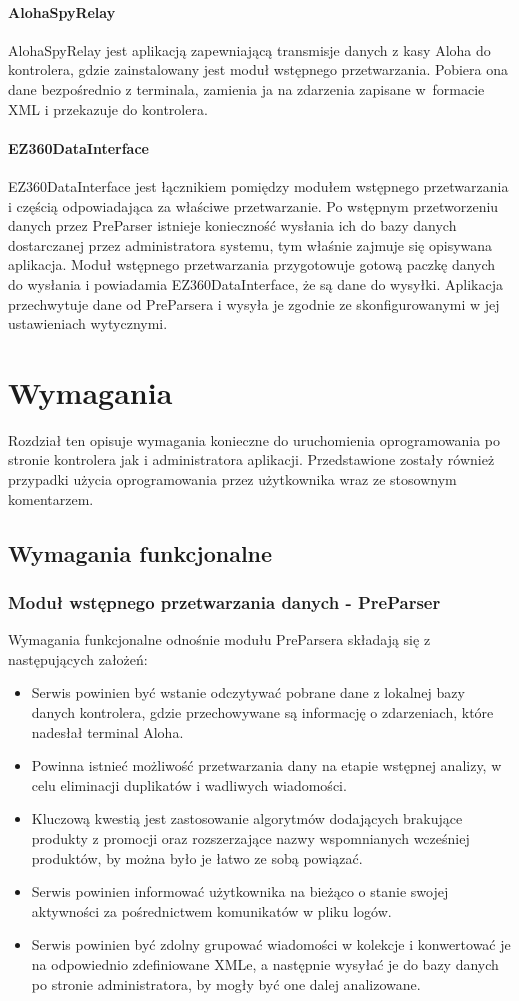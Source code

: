 \documentclass[a4paper]{book}
\begin{document}
\subsubsection{AlohaSpyRelay}
AlohaSpyRelay jest aplikacją zapewniającą transmisje danych z kasy Aloha do kontrolera, gdzie zainstalowany jest moduł wstępnego przetwarzania. Pobiera ona dane bezpośrednio z terminala, zamienia ja na zdarzenia zapisane w~formacie XML i przekazuje do kontrolera.
\subsubsection{EZ360DataInterface}
EZ360DataInterface jest łącznikiem pomiędzy modułem wstępnego przetwarzania i częścią odpowiadająca za właściwe przetwarzanie. Po wstępnym przetworzeniu danych przez PreParser istnieje konieczność wysłania ich do bazy danych dostarczanej przez administratora systemu, tym właśnie zajmuje się opisywana aplikacja. Moduł wstępnego przetwarzania przygotowuje gotową paczkę danych do wysłania i powiadamia EZ360DataInterface, że są dane do wysyłki. Aplikacja przechwytuje dane od PreParsera i wysyła je zgodnie ze skonfigurowanymi w jej ustawieniach wytycznymi.
\chapter{Wymagania}
\label{rozdzial3}
Rozdział ten opisuje wymagania konieczne do uruchomienia oprogramowania po stronie kontrolera jak i administratora aplikacji. Przedstawione zostały również przypadki użycia oprogramowania przez użytkownika wraz ze stosownym komentarzem.
\section{Wymagania funkcjonalne}
\subsection{Moduł wstępnego przetwarzania danych - PreParser}
Wymagania funkcjonalne odnośnie modułu PreParsera składają się z następujących założeń:
\begin{itemize}
	\item Serwis powinien być wstanie odczytywać pobrane dane z lokalnej bazy danych kontrolera, gdzie przechowywane są informację o zdarzeniach, które nadesłał terminal Aloha.
	\item Powinna istnieć możliwość przetwarzania dany na etapie wstępnej analizy, w celu eliminacji duplikatów i wadliwych wiadomości.
	\item Kluczową kwestią jest zastosowanie algorytmów dodających brakujące produkty z promocji oraz rozszerzające nazwy wspomnianych wcześniej produktów, by można było je łatwo ze sobą powiązać.
	\item Serwis powinien informować użytkownika na bieżąco o stanie swojej aktywności za pośrednictwem komunikatów w pliku logów.
	\item Serwis powinien być zdolny grupować wiadomości w kolekcje i konwertować je na odpowiednio zdefiniowane XMLe, a następnie wysyłać je do bazy danych po stronie administratora, by mogły być one dalej analizowane.
\end{itemize}
\end{document}
